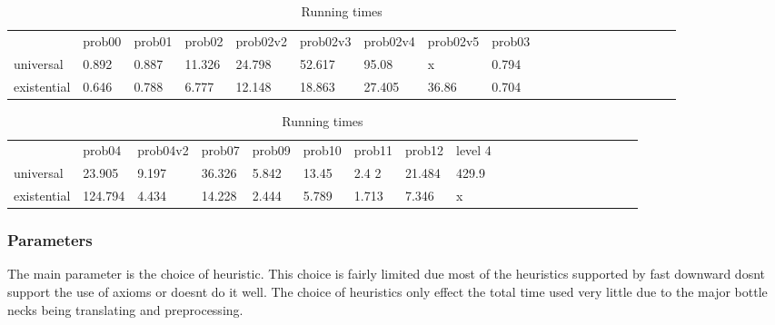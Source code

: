 \begin{table}[h]
	\centering
	\caption{Running times}
	\label{times}
	\begin{tabular}{llllllllllllllllllll}
		& prob00 & prob01& prob02& prob02v2& prob02v3& prob02v4& prob02v5& prob03\\
		universal 	& 0.892  &0.887  &11.326 &24.798   &52.617   &95.08    & x       &0.794    \\
		existential &0.646   &0.788  &6.777  &12.148   &18.863   &27.405   &36.86    &0.704  \\
	\end{tabular}
	\begin{tabular}{llllllllllllllllllll}
		&  prob04& prob04v2& prob07&  prob09& prob10& prob11& prob12 & level 4\\
		universal    &23.905  &9.197      &36.326   &5.842  &13.45  &2.4 2           &21.484 &429.9\\
		existential      &124.794 &4.434   &14.228 &2.444  &5.789  &1.713        &7.346 & x\\
	\end{tabular}
\end{table}




\subsubsection{Parameters}
The main parameter is the choice of heuristic. This choice is fairly limited due most of the heuristics supported by fast downward dosnt support the use of axioms or doesnt do it well. The choice of heuristics only effect the total time used very little due to the major bottle necks being translating and preprocessing.





			